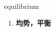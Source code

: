 
\begin{frame}
{\huge equilibrium}
\begin{center}
\begin{enumerate}\Large
  \item \textbf{均势，平衡}
\end{enumerate}
\end{center}
\end{frame}
